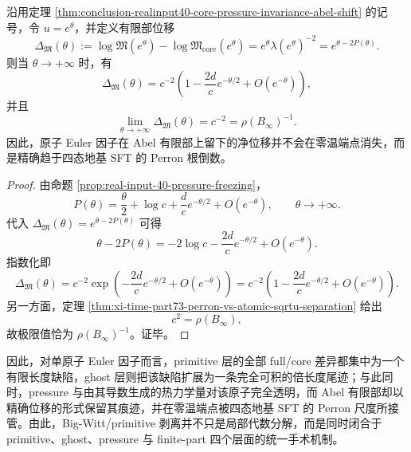 \begin{corollary}\label{cor:conclusion-realinput40-zero-temp-finitepart-displacement}
沿用定理 \ref{thm:conclusion-realinput40-core-pressure-invariance-abel-shift} 的记号，令 \(u=e^\theta\)，并定义有限部位移
\[
\Delta_{\mathfrak M}(\theta)
:=
\log\mathfrak M(e^\theta)-\log\mathfrak M_{\mathrm{core}}(e^\theta)
=
e^\theta\lambda(e^\theta)^{-2}
=
e^{\theta-2P(\theta)}.
\]
则当 \(\theta\to+\infty\) 时，有
\[
\boxed{\;
\Delta_{\mathfrak M}(\theta)
=
c^{-2}\left(1-\frac{2d}{c}e^{-\theta/2}+O(e^{-\theta})\right),\;}
\]
并且
\[
\boxed{\;
\lim_{\theta\to+\infty}\Delta_{\mathfrak M}(\theta)
=
c^{-2}
=
\rho(B_\infty)^{-1}.\;}
\]
因此，原子 Euler 因子在 Abel 有限部上留下的净位移并不会在零温端点消失，而是精确趋于四态地基 SFT 的 Perron 根倒数。
\end{corollary}
\begin{proof}
由命题 \ref{prop:real-input-40-pressure-freezing}，
\[
P(\theta)
=
\frac{\theta}{2}+\log c+\frac{d}{c}e^{-\theta/2}+O(e^{-\theta}),
\qquad
\theta\to+\infty.
\]
代入
\(
\Delta_{\mathfrak M}(\theta)=e^{\theta-2P(\theta)}
\)
可得
\[
\theta-2P(\theta)
=
-2\log c-\frac{2d}{c}e^{-\theta/2}+O(e^{-\theta}).
\]
指数化即
\[
\Delta_{\mathfrak M}(\theta)
=
c^{-2}\exp\!\left(-\frac{2d}{c}e^{-\theta/2}+O(e^{-\theta})\right)
=
c^{-2}\left(1-\frac{2d}{c}e^{-\theta/2}+O(e^{-\theta})\right).
\]
另一方面，定理 \ref{thm:xi-time-part73-perron-vs-atomic-sqrtu-separation} 给出
\[
c^2=\rho(B_\infty),
\]
故极限值恰为 \(\rho(B_\infty)^{-1}\)。证毕。
\end{proof}

因此，对单原子 Euler 因子而言，primitive 层的全部 full/core 差异都集中为一个有限长度缺陷，ghost 层则把该缺陷扩展为一条完全可积的倍长度尾迹；与此同时，pressure 与由其导数生成的热力学量对该原子完全透明，而 Abel 有限部却以精确位移的形式保留其痕迹，并在零温端点被四态地基 SFT 的 Perron 尺度所接管。由此，Big-Witt/primitive 剥离并不只是局部代数分解，而是同时闭合于 primitive、ghost、pressure 与 finite-part 四个层面的统一手术机制。





\endinput
